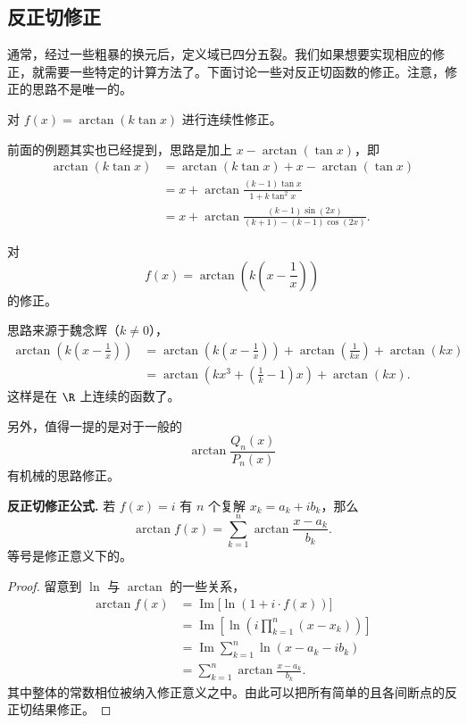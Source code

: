 \subsection*{反正切修正}

通常，经过一些粗暴的换元后，定义域已四分五裂。我们如果想要实现相应的修正，就需要一些特定的计算方法了。下面讨论一些对反正切函数的修正。注意，修正的思路不是唯一的。

\begin{example}
	对 $f(x)=\arctan(k\tan x)$ 进行连续性修正。
	
	前面的例题其实也已经提到，思路是加上 $x-\arctan(\tan x)$，即
	\[
	\begin{aligned}
		\arctan(k\tan x)
		&=\arctan(k\tan x)+x-\arctan(\tan x) \\
		&=x+\arctan\frac{(k-1)\tan x}{1+k\tan^2x} \\
		&=x+\arctan\frac{(k-1)\sin(2x)}{(k+1)-(k-1)\cos(2x)}.
	\end{aligned}
	\]
\end{example}

\begin{example}
	对
	\[
	f(x)=\arctan\left(k\left(x-\frac1x\right)\right)
	\]
	的修正。
	
	思路来源于魏念辉（$k\neq0$），
	\[
	\begin{aligned}
		\arctan\left(k\left(x-\frac1x\right)\right)
		&=\arctan\left(k\left(x-\frac1x\right)\right)
		+\arctan\left(\frac1{kx}\right)+\arctan(kx) \\
		&=\arctan\left(kx^3+\left(\frac1k-1\right)x\right)+\arctan(kx).
	\end{aligned}
	\]
	这样是在 $\R$ 上连续的函数了。
	
	另外，值得一提的是对于一般的
	\[
	\arctan\frac{Q_n(x)}{P_n(x)}
	\]
	有机械的思路修正。
\end{example}

\begin{proposition}
	\textbf{反正切修正公式.}
	若 $f(x)=i$ 有 $n$ 个复解 $x_k=a_k+i b_k$，那么
	\[
	\arctan f(x)=\sum_{k=1}^{n}\arctan\frac{x-a_k}{b_k}. 
	\]
	等号是修正意义下的。
\end{proposition}

\begin{proof}
	留意到 $\ln$ 与 $\arctan$ 的一些关系，
	\[
	\begin{aligned}
		\arctan f(x)
		&=\operatorname{Im}\bigl[\ln(1+i\cdot f(x))\bigr] \\
		&=\operatorname{Im}\left[\ln\left(i\prod_{k=1}^{n}(x-x_k)\right)\right] \\
		&=\operatorname{Im}\sum_{k=1}^{n}\ln(x-a_k-i b_k) \\
		&=\sum_{k=1}^{n}\arctan\frac{x-a_k}{b_k}.
	\end{aligned}
	\]
	其中整体的常数相位被纳入修正意义之中。由此可以把所有简单的且各间断点的反正切结果修正。
\end{proof}

